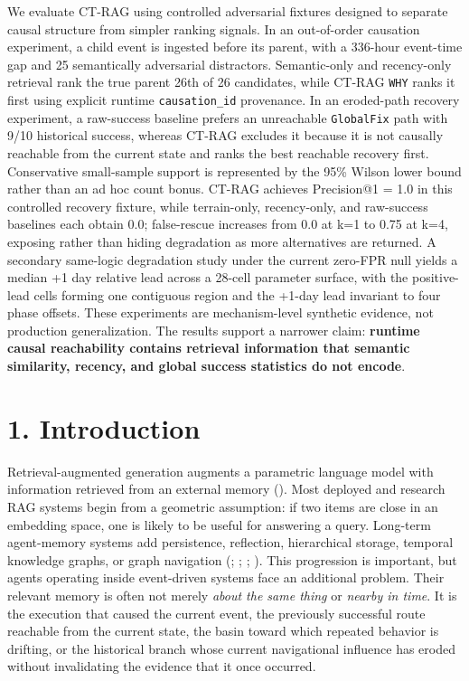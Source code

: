 \documentclass[
  11pt,
]{article}
\begin{document}
We evaluate CT-RAG using controlled adversarial fixtures designed to
separate causal structure from simpler ranking signals. In an
out-of-order causation experiment, a child event is ingested before its
parent, with a 336-hour event-time gap and 25 semantically adversarial
distractors. Semantic-only and recency-only retrieval rank the true
parent 26th of 26 candidates, while CT-RAG \texttt{WHY} ranks it first using explicit
runtime \texttt{causation\_id} provenance. In an eroded-path recovery
experiment, a raw-success baseline prefers an unreachable
\texttt{GlobalFix} path with 9/10 historical success, whereas CT-RAG
excludes it because it is not causally reachable from the current state
and ranks the best reachable recovery first. Conservative small-sample
support is represented by the 95\% Wilson lower bound rather than an ad
hoc count bonus. CT-RAG achieves Precision@1 = 1.0 in this controlled
recovery fixture, while terrain-only, recency-only, and raw-success
baselines each obtain 0.0; false-rescue increases from 0.0 at k=1 to
0.75 at k=4, exposing rather than hiding degradation as more
alternatives are returned. A secondary same-logic degradation study under the current zero-FPR null
yields a median +1 day relative lead across a 28-cell parameter surface,
with the positive-lead cells forming one contiguous region and the
+1-day lead invariant to four phase offsets. These experiments are
mechanism-level synthetic evidence, not production generalization. The
results support a narrower claim: \textbf{runtime causal reachability
contains retrieval information that semantic similarity, recency, and
global success statistics do not encode}.

\section{1. Introduction}\label{introduction}

Retrieval-augmented generation augments a parametric language model with
information retrieved from an external memory
(). Most deployed and
research RAG systems begin from a geometric assumption: if two items are
close in an embedding space, one is likely to be useful for answering a
query. Long-term agent-memory systems add persistence, reflection,
hierarchical storage, temporal knowledge graphs, or graph navigation
(;
;
;
). This
progression is important, but agents operating inside event-driven
systems face an additional problem. Their relevant memory is often not
merely \emph{about the same thing} or \emph{nearby in time}. It is the
execution that caused the current event, the previously successful route
reachable from the current state, the basin toward which repeated
behavior is drifting, or the historical branch whose current
navigational influence has eroded without invalidating the evidence that
it once occurred.
\end{document}
